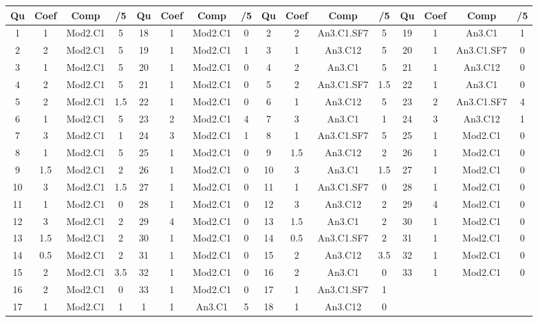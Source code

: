 \footnotesize 
\begin{center} 
\begin{tabular}{|c|c|c|c||c|c|c|c||c|c|c|c||c|c|c|c|} 
\hline \textbf{Qu} & \textbf{Coef} & \textbf{Comp} & \textbf{/5} & \textbf{Qu} & \textbf{Coef} & \textbf{Comp} & \textbf{/5} & \textbf{Qu} & \textbf{Coef} & \textbf{Comp} & \textbf{/5} & \textbf{Qu} & \textbf{Coef} & \textbf{Comp} & \textbf{/5} \\ 
\hline 
\hline 
1 & 1 & Mod2.C1 & 5 & 18 & 1 & Mod2.C1 & 0 & 2 & 2 & An3.C1.SF7 & 5 & 19 & 1 & An3.C1 & 1 \\ \hline 
2 & 2 & Mod2.C1 & 5 & 19 & 1 & Mod2.C1 & 1 & 3 & 1 & An3.C12 & 5 & 20 & 1 & An3.C1.SF7 & 0 \\ \hline 
3 & 1 & Mod2.C1 & 5 & 20 & 1 & Mod2.C1 & 0 & 4 & 2 & An3.C1 & 5 & 21 & 1 & An3.C12 & 0 \\ \hline 
4 & 2 & Mod2.C1 & 5 & 21 & 1 & Mod2.C1 & 0 & 5 & 2 & An3.C1.SF7 & 1.5 & 22 & 1 & An3.C1 & 0 \\ \hline 
5 & 2 & Mod2.C1 & 1.5 & 22 & 1 & Mod2.C1 & 0 & 6 & 1 & An3.C12 & 5 & 23 & 2 & An3.C1.SF7 & 4 \\ \hline 
6 & 1 & Mod2.C1 & 5 & 23 & 2 & Mod2.C1 & 4 & 7 & 3 & An3.C1 & 1 & 24 & 3 & An3.C12 & 1 \\ \hline 
7 & 3 & Mod2.C1 & 1 & 24 & 3 & Mod2.C1 & 1 & 8 & 1 & An3.C1.SF7 & 5 & 25 & 1 & Mod2.C1 & 0 \\ \hline 
8 & 1 & Mod2.C1 & 5 & 25 & 1 & Mod2.C1 & 0 & 9 & 1.5 & An3.C12 & 2 & 26 & 1 & Mod2.C1 & 0 \\ \hline 
9 & 1.5 & Mod2.C1 & 2 & 26 & 1 & Mod2.C1 & 0 & 10 & 3 & An3.C1 & 1.5 & 27 & 1 & Mod2.C1 & 0 \\ \hline 
10 & 3 & Mod2.C1 & 1.5 & 27 & 1 & Mod2.C1 & 0 & 11 & 1 & An3.C1.SF7 & 0 & 28 & 1 & Mod2.C1 & 0 \\ \hline 
11 & 1 & Mod2.C1 & 0 & 28 & 1 & Mod2.C1 & 0 & 12 & 3 & An3.C12 & 2 & 29 & 4 & Mod2.C1 & 0 \\ \hline 
12 & 3 & Mod2.C1 & 2 & 29 & 4 & Mod2.C1 & 0 & 13 & 1.5 & An3.C1 & 2 & 30 & 1 & Mod2.C1 & 0 \\ \hline 
13 & 1.5 & Mod2.C1 & 2 & 30 & 1 & Mod2.C1 & 0 & 14 & 0.5 & An3.C1.SF7 & 2 & 31 & 1 & Mod2.C1 & 0 \\ \hline 
14 & 0.5 & Mod2.C1 & 2 & 31 & 1 & Mod2.C1 & 0 & 15 & 2 & An3.C12 & 3.5 & 32 & 1 & Mod2.C1 & 0 \\ \hline 
15 & 2 & Mod2.C1 & 3.5 & 32 & 1 & Mod2.C1 & 0 & 16 & 2 & An3.C1 & 0 & 33 & 1 & Mod2.C1 & 0 \\ \hline 
16 & 2 & Mod2.C1 & 0 & 33 & 1 & Mod2.C1 & 0 & 17 & 1 & An3.C1.SF7 & 1 &  &  &  &  \\ \hline 

17 & 1 & Mod2.C1 & 1 & 1 & 1 & An3.C1 & 5 & 18 & 1 & An3.C12 & 0 &  &  &  &  \\ \hline 

\end{tabular} 
\end{center} 
\normalsize 
 
